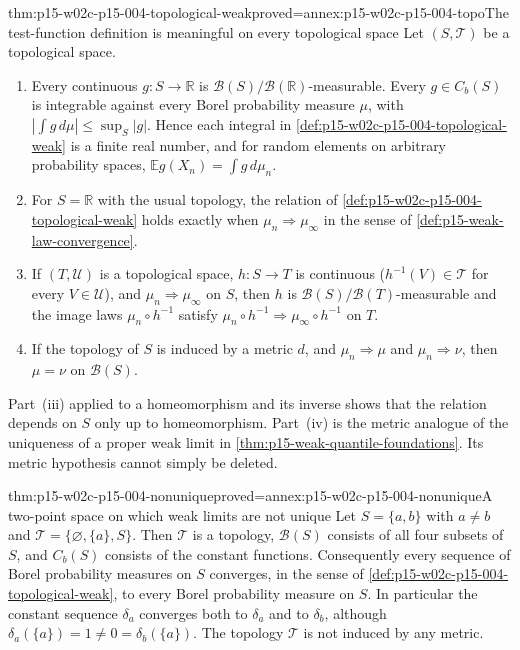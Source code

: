 \begin{hbtheorem}{thm:p15-w02c-p15-004-topological-weak}{proved=annex:p15-w02c-p15-004-topo}{The test-function definition is meaningful on every topological space}
Let \((S,\mathcal T)\) be a topological space.
\begin{enumerate}
\item Every continuous \(g:S\to\mathbb R\) is
\(\mathcal B(S)/\mathcal B(\mathbb R)\)-measurable. Every
\(g\in C_b(S)\) is integrable against every Borel probability measure
\(\mu\), with \(|\int g\,d\mu|\leq\sup_S|g|\). Hence each integral in
\cref{def:p15-w02c-p15-004-topological-weak} is a finite real number,
and for random elements on arbitrary probability spaces,
\(\mathbb E g(X_n)=\int g\,d\mu_n\).
\item For \(S=\mathbb R\) with the usual topology, the relation of
\cref{def:p15-w02c-p15-004-topological-weak} holds exactly when
\(\mu_n\Rightarrow\mu_\infty\) in the sense of
\cref{def:p15-weak-law-convergence}.
\item If \((T,\mathcal U)\) is a topological space,
\(h:S\to T\) is continuous (\(h^{-1}(V)\in\mathcal T\) for every
\(V\in\mathcal U\)), and \(\mu_n\Rightarrow\mu_\infty\) on \(S\), then
\(h\) is \(\mathcal B(S)/\mathcal B(T)\)-measurable and the image laws
\(\mu_n\circ h^{-1}\) satisfy
\(\mu_n\circ h^{-1}\Rightarrow\mu_\infty\circ h^{-1}\) on \(T\).
\item If the topology of \(S\) is induced by a metric \(d\), and
\(\mu_n\Rightarrow\mu\) and \(\mu_n\Rightarrow\nu\), then \(\mu=\nu\)
on \(\mathcal B(S)\).
\end{enumerate}
\end{hbtheorem}

Part~(iii) applied to a homeomorphism and its inverse shows that the
relation depends on \(S\) only up to homeomorphism. Part~(iv) is the
metric analogue of the uniqueness of a proper weak limit in
\cref{thm:p15-weak-quantile-foundations}. Its metric hypothesis cannot
simply be deleted.

\begin{hbtheorem}{thm:p15-w02c-p15-004-nonunique}{proved=annex:p15-w02c-p15-004-nonunique}{A two-point space on which weak limits are not unique}
Let \(S=\{a,b\}\) with \(a\neq b\) and
\(\mathcal T=\{\varnothing,\{a\},S\}\). Then \(\mathcal T\) is a
topology, \(\mathcal B(S)\) consists of all four subsets of \(S\), and
\(C_b(S)\) consists of the constant functions. Consequently every
sequence of Borel probability measures on \(S\) converges, in the sense
of \cref{def:p15-w02c-p15-004-topological-weak}, to every Borel
probability measure on \(S\). In particular the constant sequence
\(\delta_a\) converges both to \(\delta_a\) and to \(\delta_b\), although
\(\delta_a(\{a\})=1\neq0=\delta_b(\{a\})\). The topology \(\mathcal T\)
is not induced by any metric.
\end{hbtheorem}

